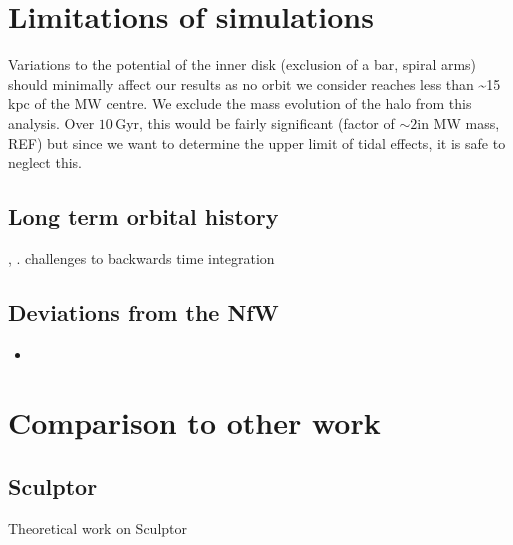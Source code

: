 \section{Limitations of simulations}\label{limitations-of-simulations}

Variations to the potential of the inner disk (exclusion of a bar,
spiral arms) should minimally affect our results as no orbit we consider
reaches less than \textasciitilde15 kpc of the MW centre. We exclude the
mass evolution of the halo from this analysis. Over \(10\,\)Gyr, this
would be fairly significant (factor of \(\sim 2\)in MW mass, REF) but
since we want to determine the upper limit of tidal effects, it is safe
to neglect this.

\subsection{Long term orbital history}\label{long-term-orbital-history}

\citet{dsouza+bell2022}, \citet{santistevan+2024}. challenges to
backwards time integration

\subsection{Deviations from the NfW}\label{deviations-from-the-nfw}

\begin{itemize}
\tightlist
\item
  \citet{dicintio+2013}
\end{itemize}

\section{Comparison to other work}\label{comparison-to-other-work}

\subsection{Sculptor}\label{sculptor}

Theoretical work on Sculptor


